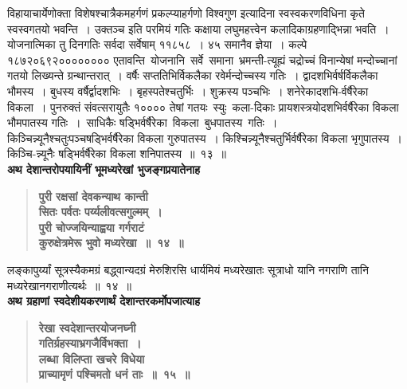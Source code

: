 \documentclass[11pt, openany]{book}
\begin{document}
\newpage

\noindent विहायाचार्येणोक्ता विशेषश्चात्रैकमहर्गणं प्रकल्प्याहर्गणो विश्वगुण इत्यादिना स्वस्वकरणविधिना कृते स्वस्वगतयो भवन्ति~। उक्तञ्च इति \;परमियं \;गतिः \;कक्षाया \;लघुमहत्त्वेन \;कलादिकाग्रहणाद्भिन्ना \;भवति~। योजनात्मिका तु दिनगतिः सर्वदा सर्वेषाम् ११८५८~। ४५ समानैव ज्ञेया~। कल्पे \;१८७२०६९२०००००००० \;एतावन्ति \,योजनानि \,सर्वे \,समाना \,भ्रमन्ती-त्यूह्यं \;चद्रोच्चं \;विनान्येषां \;मन्दोच्चानां \;गतयो \;लिख्यन्ते \;ग्रन्थान्तरात्~। \;वर्षैः सप्ततिभिर्विकलैका रवेर्मन्दोच्चस्य गतिः~। द्वादशभिर्वर्षर्विकलैका भौमस्य~। बुधस्य वर्षैर्द्वादशभिः~। बृहस्पतेश्चतुर्भिः~। शुक्रस्य पञ्चभिः~। शनेरेकादशभि-र्वर्षैरेका \;विकला~। पुनरुक्तं \;संवत्सरायुतैः \;१०००० \;तेषां \;गतयः \,स्युः \,कला-दिकाः \;प्रायशस्त्रयोदशभिर्वर्षैरेका \;विकला \;भौमपातस्य \;गतिः~। \,साधिकैः षड्भिर्वर्षैरेका \,विकला \,बुधपातस्य \,गतिः~। \,किञ्चिन्न्यूनैश्चतुःपञ्चषड्भिर्वर्षैरेका विकला गुरुपातस्य~। किश्चिन्न्यूनैश्चतुर्भिर्वर्षैरेका विकला भृगुपातस्य~। किञ्चि-न्न्यूनैः षड्भिर्वर्षैरेका विकला शनिपातस्य~॥~१३~॥\\

{\small \textbf{अथ देशान्तरोपयायिनीं भूमध्यरेखां भुजङ्गप्रयातेनाह \textendash }}

 \label{1.14}
\begin{quote}
{\large \textbf{{\color{purple}पुरी रक्षसां देवकन्याथ कान्ती \\
सितः पर्वतः पर्य्यलीवत्सगुल्मम्~। \\
पुरी चोज्जयिन्याह्वया गर्गराटं \\
कुरुक्षेत्रमेरू भुवो मध्यरेखा~॥~१४~॥}}}
\end{quote}

\newpage

लङ्कापुर्य्यां सूत्रस्यैकमग्रं बद्ध्वान्यदग्रं मेरुशिरसि धार्यमियं मध्यरेखातः सूत्राधो यानि नगराणि तानि मध्यरेखानगराणीत्यर्थः~॥~१४~॥\\

{\small \textbf{अथ ग्रहाणां स्वदेशीयकरणार्थं देशान्तरकर्मोपजात्याह \textendash }}

 \label{1.15}
\begin{quote}
{\large \textbf{{\color{purple}रेखा स्वदेशान्तरयोजनघ्नी \\
गतिर्ग्रहस्याभ्रगजैर्विभक्ता~। \\
लब्धा विलिप्ता खचरे विधेया \\
प्राच्यामृणं पश्चिमतो धनं ताः~॥~१५~॥}}}
\end{quote}
\end{document}
